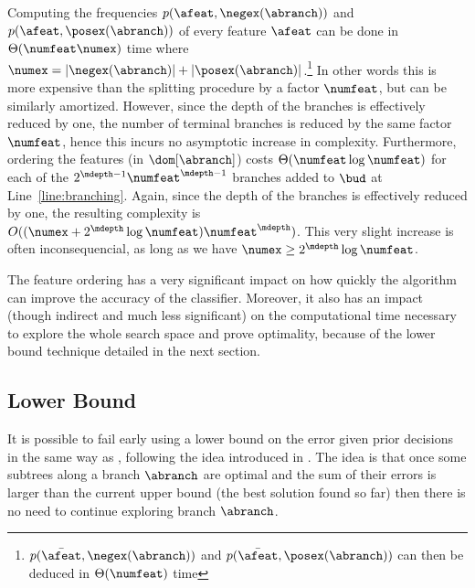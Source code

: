 \documentclass{llncs}
\begin{document}


Computing the frequencies $p(\afeat,{\negex(\abranch)})$ and $p(\afeat,{\posex(\abranch)})$ of every feature $\afeat$ can be done in  $\Theta(\numfeat\numex)$ time where 
$\numex = |\negex(\abranch)|+|\posex(\abranch)|$.\footnote{$p(\bar{\afeat},{\negex(\abranch)})$ and $p(\bar{\afeat},{\posex(\abranch)})$ can then be deduced in $\Theta(\numfeat)$ time} In other words this is more expensive than the splitting procedure by a factor $\numfeat$, but can be similarly amortized. However, since the depth of the branches is effectively reduced by one, the number of terminal branches is reduced by the same factor $\numfeat$, hence this incurs no asymptotic increase in complexity.
Furthermore, ordering the features (in $\dom[\abranch]$)
costs $\Theta(\numfeat \log \numfeat)$ for each of the $2^{\mdepth-1}\numfeat^{\mdepth-1}$ branches added to $\bud$ at Line~\ref{line:branching}. Again, since the depth of the branches is effectively reduced by one, the resulting complexity 
is $O((\numex + 2^{\mdepth} \log \numfeat) \numfeat^{\mdepth})$. This very slight increase is often inconsequencial, as long as we have $\numex \geq 2^{\mdepth} \log \numfeat$.

The feature ordering has a very significant impact on how quickly the algorithm can improve the accuracy of the classifier. Moreover, it also has an impact (though indirect and much less significant) on the computational time necessary to explore the whole search space and prove optimality, because of the lower bound technique detailed in the next section.


\subsection{Lower Bound}
\label{sec:lb}

It is possible to fail early using a lower bound on the error given prior decisions in the same way as \murtree, following the idea introduced in \cite{dl8}. The idea is that once some subtrees along a branch $\abranch$ are optimal and the sum of their errors is larger than the current upper bound (the best solution found so far) then there is no need to continue exploring branch $\abranch$. 
\end{document}

